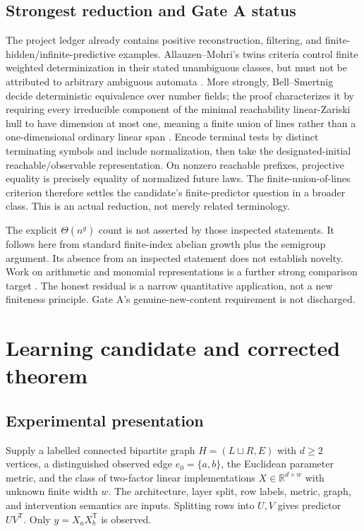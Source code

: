 \documentclass[11pt]{article}
\theoremstyle{remark}
\newcommand{\RR}{\mathbb R}
\begin{document}
\subsection{Strongest reduction and Gate A status}

The project ledger already contains positive reconstruction, filtering, and finite-hidden/infinite-predictive examples. Allauzen--Mohri's twins criteria control finite weighted determinization in their stated unambiguous classes, but must not be attributed to arbitrary ambiguous automata \cite{Twins}. More strongly, Bell--Smertnig decide deterministic equivalence over number fields; the proof characterizes it by requiring every irreducible component of the minimal reachability linear-Zariski hull to have dimension at most one, meaning a finite union of lines rather than a one-dimensional ordinary linear span \cite{BellSmertnig}. Encode terminal tests by distinct terminating symbols and include normalization, then take the designated-initial reachable/observable representation. On nonzero reachable prefixes, projective equality is precisely equality of normalized future laws. The finite-union-of-lines criterion therefore settles the candidate's finite-predictor question in a broader class. This is an actual reduction, not merely related terminology.

The explicit $\Theta(n^g)$ count is not asserted by those inspected statements. It follows here from standard finite-index abelian growth plus the semigroup argument. Its absence from an inspected statement does not establish novelty. Work on arithmetic and monomial representations is a further strong comparison target \cite{PuchSmertnig}. The honest residual is a narrow quantitative application, not a new finiteness principle. Gate A's genuine-new-content requirement is not discharged.

\section{Learning candidate and corrected theorem}
\label{sec:learning}

\subsection{Experimental presentation}

Supply a labelled connected bipartite graph $H=(L\sqcup R,E)$ with $d\geq2$ vertices, a distinguished observed edge $e_0=\{a,b\}$, the Euclidean parameter metric, and the class of two-factor linear implementations $X\in\RR^{d\times w}$ with unknown finite width $w$. The architecture, layer split, row labels, metric, graph, and intervention semantics are inputs. Splitting rows into $U,V$ gives predictor $UV^{\mathsf T}$. Only $y=X_aX_b^{\mathsf T}$ is observed.
\end{document}
